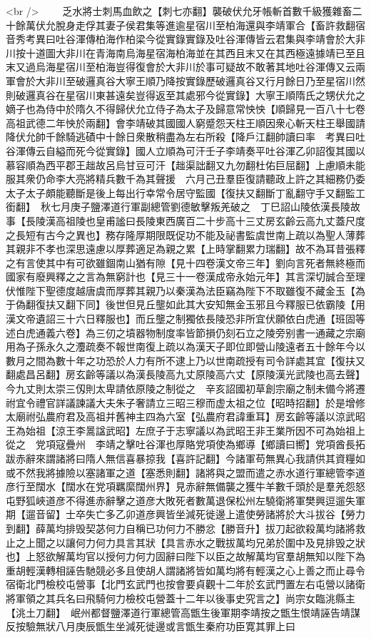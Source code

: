 <br />
　　乏水將士刺馬血飲之【刺七亦翻】襲破伏允牙帳斬首數千級獲雜畜二十餘萬伏允脫身走俘其妻子侯君集等進逾星宿川至柏海還與李靖軍合【畜許救翻宿音秀考異曰吐谷渾傳柏海作柏梁今從實錄實錄及吐谷渾傳皆云君集與李靖會於大非川按十道圖大非川在青海南烏海星宿海柏海並在其西且末又在其西極遠據靖已至且末又過烏海星宿川至柏海豈得復會於大非川於事可疑故不敢著其地吐谷渾傳又云兩軍會於大非川至破邏真谷大寧王順乃降按實錄歷破邏真谷又行月餘日乃至星宿川然則破邏真谷在星宿川東甚遠矣豈得返至其處邪今從實錄】大寧王順隋氏之甥伏允之嫡子也為侍中於隋久不得歸伏允立侍子為太子及歸意常怏怏【順歸見一百八十七卷高祖武德二年怏於兩翻】會李靖破其國國人窮蹙怨天柱王順因衆心斬天柱王舉國請降伏允帥千餘騎逃磧中十餘日衆散稍盡為左右所殺【降戶江翻帥讀曰率　考異曰吐谷渾傳云自縊而死今從實錄】國人立順為可汗壬子李靖奏平吐谷渾乙卯詔復其國以慕容順為西平郡王趉故呂烏甘豆可汗【趉渠詘翻又九勿翻杜佑巨屈翻】上慮順未能服其衆仍命李大亮將精兵數千為其聲援　六月己丑羣臣復請聽政上許之其細務仍委太子太子頗能聽斷是後上每出行幸常令居守監國【復扶又翻斷丁亂翻守手又翻監工銜翻】　秋七月庚子鹽澤道行軍副總管劉德敏擊叛羌破之　丁巳詔山陵依漢長陵故事【長陵漢高祖陵也皇甫謐曰長陵東西廣百二十步高十三丈房玄齡云高九丈蓋尺度之長短有古今之異也】務存隆厚期限既促功不能及祕書監虞世南上疏以為聖人薄葬其親非不孝也深思遠慮以厚葬適足為親之累【上時掌翻累力瑞翻】故不為耳昔張釋之有言使其中有可欲雖錮南山猶有隙【見十四卷漢文帝三年】劉向言死者無終極而國家有廢興釋之之言為無窮計也【見三十一卷漢成帝永始元年】其言深切誠合至理伏惟陛下聖德度越唐虞而厚葬其親乃以秦漢為法臣竊為陛下不取雖復不藏金玉【為于偽翻復扶又翻下同】後世但見丘壟如此其大安知無金玉邪且今釋服已依霸陵【用漢文帝遺詔三十六日釋服也】而丘壟之制獨依長陵恐非所宜伏願依白虎通【班固等述白虎通義六卷】為三仞之墳器物制度率皆節損仍刻石立之陵旁别書一通藏之宗廟用為子孫永久之灋疏奏不報世南復上疏以為漢天子即位即營山陵遠者五十餘年今以數月之間為數十年之功恐於人力有所不逮上乃以世南疏授有司令詳處其宜【復扶又翻處昌呂翻】房玄齡等議以為漢長陵高九丈原陵高六丈【原陵漢光武陵也高去聲】今九丈則太崇三仭則太卑請依原陵之制從之　辛亥詔國初草創宗廟之制未備今將遷祔宜令禮官詳議諫議大夫朱子奢請立三昭三穆而虚太祖之位【昭時招翻】於是增修太廟祔弘農府君及高祖并舊神主四為六室【弘農府君諱重耳】房玄齡等議以涼武昭王為始祖【涼王李暠諡武昭】左庶子于志寧議以為武昭王非王業所因不可為始祖上從之　党項寇疊州　李靖之擊吐谷渾也厚賂党項使為鄉導【鄉讀曰嚮】党項酋長拓跋赤辭來謂諸將曰隋人無信喜暴掠我【喜許記翻】今諸軍苟無異心我請供其資糧如或不然我將據險以塞諸軍之道【塞悉則翻】諸將與之盟而遣之赤水道行軍總管李道彦行至闊水【闊水在党項羈縻闊州界】見赤辭無備襲之獲牛羊數千頭於是羣羌怨怒屯野狐峽道彦不得進赤辭擊之道彦大敗死者數萬退保松州左驍衛將軍樊興逗遛失軍期【遛音留】士卒失亡多乙卯道彦興皆坐減死徙邊上遣使勞諸將於大斗拔谷【勞力到翻】薛萬均排毁契苾何力自稱已功何力不勝忿【勝音升】拔刀起欲殺萬均諸將救止之上聞之以讓何力何力具言其狀【具言赤水之戰拔萬均兄弟於圍中及見排毁之狀也】上怒欲解萬均官以授何力何力固辭曰陛下以臣之故解萬均官羣胡無知以陛下為重胡輕漢轉相誣告馳競必多且使胡人謂諸將皆如萬均將有輕漢之心上善之而止尋令宿衛北門檢校屯營事【北門玄武門也按會要貞觀十二年於玄武門置左右屯營以諸衛將軍領之其兵名曰飛騎何力檢校屯營蓋十二年以後事史究言之】尚宗女臨洮縣主【洮土刀翻】　岷州都督鹽澤道行軍總管高甑生後軍期李靖按之甑生恨靖誣告靖謀反按驗無狀八月庚辰甑生坐減死徙邊或言甑生秦府功臣寛其罪上曰